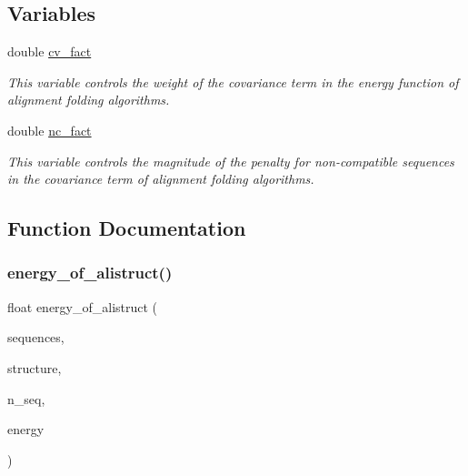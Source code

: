\subsection*{Variables}
\begin{DoxyCompactItemize}
\item 
double \mbox{\hyperlink{group__consensus__fold_gaf3cbac6ff5d706d6e414677841ddf94c}{cv\+\_\+fact}}
\begin{DoxyCompactList}\small\item\em This variable controls the weight of the covariance term in the energy function of alignment folding algorithms. \end{DoxyCompactList}\item 
double \mbox{\hyperlink{group__consensus__fold_ga502948a122a2af5b914355b1f3ea2f61}{nc\+\_\+fact}}
\begin{DoxyCompactList}\small\item\em This variable controls the magnitude of the penalty for non-\/compatible sequences in the covariance term of alignment folding algorithms. \end{DoxyCompactList}\end{DoxyCompactItemize}


\subsection{Function Documentation}
\mbox{\label{group__consensus__fold_ga1c48869c03b49a342bf4cbdd61900081}} 
\subsubsection{\texorpdfstring{energy\+\_\+of\+\_\+alistruct()}{energy\_of\_alistruct()}}
{\footnotesize\ttfamily float energy\+\_\+of\+\_\+alistruct (\begin{DoxyParamCaption}\item[{const char $\ast$$\ast$}]{sequences,  }\item[{const char $\ast$}]{structure,  }\item[{int}]{n\+\_\+seq,  }\item[{float $\ast$}]{energy }\end{DoxyParamCaption})}



